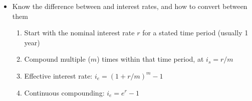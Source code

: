 \begin{itemize}
    \item Know the difference between  and  interest rates, and how to convert between them
    \begin{enumerate}
        \item Start with the nominal interest rate $r$ for a stated time period (usually 1 year)
        \item Compound multiple ($m$) times within that time period, at $i_s = r/m$
        \item Effective interest rate: $i_e = (1+r/m)^m - 1$
        \item Continuous compounding: $i_e = e^r - 1$
    \end{enumerate}
\end{itemize}
